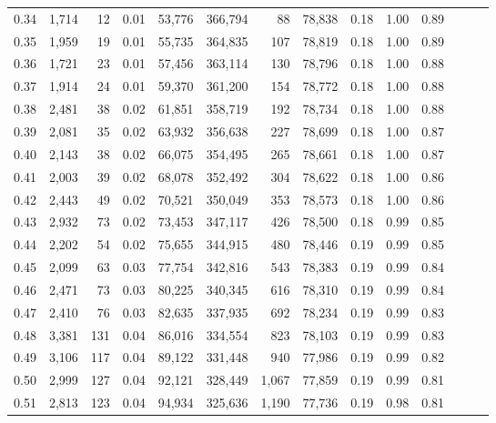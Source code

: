 \begin{tabular}{rrrrrrrrrrrrrr}
0.34 &   1,714 &     12 &  0.01 &   53,776 &  366,794 &      88 &  78,838 &  0.18 &  1.00 &      0.89 \\
0.35 &   1,959 &     19 &  0.01 &   55,735 &  364,835 &     107 &  78,819 &  0.18 &  1.00 &      0.89 \\
0.36 &   1,721 &     23 &  0.01 &   57,456 &  363,114 &     130 &  78,796 &  0.18 &  1.00 &      0.88 \\
0.37 &   1,914 &     24 &  0.01 &   59,370 &  361,200 &     154 &  78,772 &  0.18 &  1.00 &      0.88 \\
0.38 &   2,481 &     38 &  0.02 &   61,851 &  358,719 &     192 &  78,734 &  0.18 &  1.00 &      0.88 \\
0.39 &   2,081 &     35 &  0.02 &   63,932 &  356,638 &     227 &  78,699 &  0.18 &  1.00 &      0.87 \\
0.40 &   2,143 &     38 &  0.02 &   66,075 &  354,495 &     265 &  78,661 &  0.18 &  1.00 &      0.87 \\
0.41 &   2,003 &     39 &  0.02 &   68,078 &  352,492 &     304 &  78,622 &  0.18 &  1.00 &      0.86 \\
0.42 &   2,443 &     49 &  0.02 &   70,521 &  350,049 &     353 &  78,573 &  0.18 &  1.00 &      0.86 \\
0.43 &   2,932 &     73 &  0.02 &   73,453 &  347,117 &     426 &  78,500 &  0.18 &  0.99 &      0.85 \\
0.44 &   2,202 &     54 &  0.02 &   75,655 &  344,915 &     480 &  78,446 &  0.19 &  0.99 &      0.85 \\
0.45 &   2,099 &     63 &  0.03 &   77,754 &  342,816 &     543 &  78,383 &  0.19 &  0.99 &      0.84 \\
0.46 &   2,471 &     73 &  0.03 &   80,225 &  340,345 &     616 &  78,310 &  0.19 &  0.99 &      0.84 \\
0.47 &   2,410 &     76 &  0.03 &   82,635 &  337,935 &     692 &  78,234 &  0.19 &  0.99 &      0.83 \\
0.48 &   3,381 &    131 &  0.04 &   86,016 &  334,554 &     823 &  78,103 &  0.19 &  0.99 &      0.83 \\
0.49 &   3,106 &    117 &  0.04 &   89,122 &  331,448 &     940 &  77,986 &  0.19 &  0.99 &      0.82 \\
0.50 &   2,999 &    127 &  0.04 &   92,121 &  328,449 &   1,067 &  77,859 &  0.19 &  0.99 &      0.81 \\
0.51 &   2,813 &    123 &  0.04 &   94,934 &  325,636 &   1,190 &  77,736 &  0.19 &  0.98 &      0.81 \\

\end{tabular}
